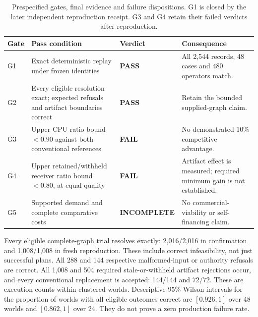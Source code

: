 \documentclass[11pt,letterpaper]{article}
\newcommand{\pass}{\textcolor{mint}{\textbf{PASS}}}
\newcommand{\miss}{\textcolor{amber}{\textbf{FAIL}}}
\begin{document}
\begin{table}[htbp]
\centering\small
\begin{tabularx}{\textwidth}{@{}p{.36in}Yp{1.10in}Y@{}}
\toprule
Gate & Pass condition & Verdict & Consequence \\
\midrule
G1 & Exact deterministic replay under frozen identities & \pass & All 2,544 records, 48 cases and 480 operators match. \\
G2 & Every eligible resolution exact; expected refusals and artifact boundaries correct & \pass & Retain the bounded supplied-graph claim. \\
G3 & Upper CPU ratio bound $<0.90$ against both conventional references & \miss & No demonstrated 10\% competitive advantage. \\
G4 & Upper retained/withheld receiver ratio bound $<0.80$, at equal quality & \miss & Artifact effect is measured; required minimum gain is not established. \\
G5 & Supported demand and complete comparative costs & \textcolor{amber}{\textbf{INCOMPLETE}} & No commercial-viability or self-financing claim. \\
\bottomrule
\end{tabularx}
\caption{Prespecified gates, final evidence and failure dispositions. G1 is closed by the later independent reproduction receipt. G3 and G4 retain their failed verdicts after reproduction.}
\label{tab:gates}
\end{table}

Every eligible complete-graph trial resolves exactly: 2,016/2,016 in confirmation and 1,008/1,008 in fresh reproduction. These include correct infeasibility, not just successful plans. All 288 and 144 respective malformed-input or authority refusals are correct. All 1,008 and 504 required stale-or-withheld artifact rejections occur, and every conventional replacement is accepted: 144/144 and 72/72. These are execution counts within clustered worlds. Descriptive 95\% Wilson intervals for the proportion of worlds with all eligible outcomes correct are $[0.926,1]$ over 48 worlds and $[0.862,1]$ over 24. They do not prove a zero production failure rate.
\end{document}
